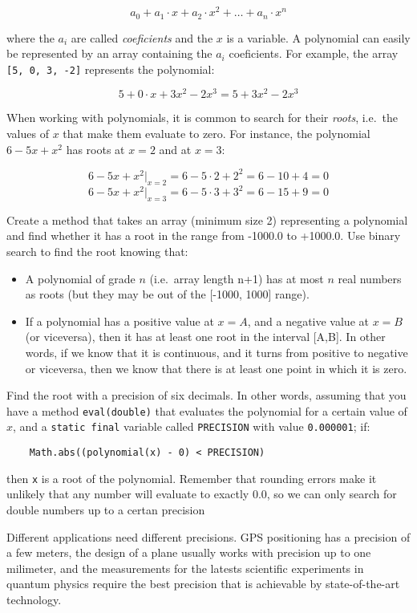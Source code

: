 \documentclass{article}
\begin{document}
$$ a_0 + a_1 \cdot x + a_2 \cdot x^2 + \ldots + a_n \cdot x^n $$ 

where the $a_i$ are called \emph{coeficients} and the $x$ is a variable. A
polynomial can easily be represented by an array containing the $a_i$
coeficients. For example, the array \verb+[5, 0, 3, -2]+ represents
the polynomial: 

$$ 5 + 0 \cdot x + 3 x^2 - 2 x^3 = 5 + 3 x^2 - 2 x^3 $$

When working with polynomials, it is common to search for their
\emph{roots}, i.e.~the values of $x$ that make them evaluate to
zero. For instance, the polynomial $6 - 5 x + x^2$ has roots 
at $x = 2$ and at $x = 3$: 

$$ 6 - 5 x + x^2 |_{x = 2} = 6 - 5 \cdot 2 + 2^2 = 6 - 10 + 4 = 0 $$
$$ 6 - 5 x + x^2 |_{x = 3} = 6 - 5 \cdot 3 + 3^2 = 6 - 15 + 9 = 0 $$

Create a method that takes an array (minimum size 2) representing a
polynomial and find whether it has a root in the range from -1000.0 to
+1000.0. Use binary search to find the root knowing that: 

\begin{itemize}
\item A polynomial of grade $n$ (i.e.~array length n+1) has at most
  $n$ real numbers as roots 
  (but they may be out of the [-1000, 1000] range).
\item If a polynomial has a positive value at $x = A$, and a negative
  value at $x = B$ (or viceversa), then it has at least one root in the
  interval [A,B]. In other words, if we know that it is continuous,
  and it turns from positive to negative or viceversa, then we know
  that there is at
  least one point in which it is zero. 
\end{itemize}

Find the root with a precision of six decimals. In other words,
assuming that you have a method \verb+eval(double)+ that evaluates the
polynomial for a certain value of $x$, and a \verb+static final+
variable called \verb+PRECISION+ with value \verb+0.000001+;  if:

\begin{verbatim}
    Math.abs((polynomial(x) - 0) < PRECISION)
\end{verbatim}

then \verb+x+ is a root of the polynomial. Remember that rounding errors make
it unlikely that any number will evaluate to exactly 0.0, so we can
only search for double numbers up to a certan precision

Different applications need different precisions. GPS positioning has
a precision of a few meters, the design of a
plane usually works with precision up to one milimeter,
and the measurements for the latests scientific experiments in
quantum physics require the best precision that is achievable by
state-of-the-art technology. 



%
%
\end{document}
